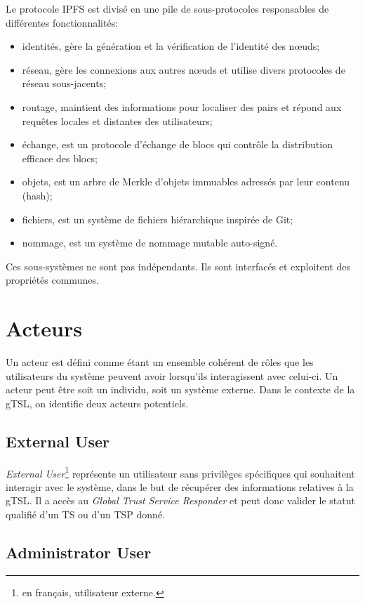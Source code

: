 \documentclass{tnreport}
\begin{document}
Le protocole IPFS est divisé en une pile de sous-protocoles responsables de différentes fonctionnalités:
\begin{itemize}
	\item identités, gère la génération et la vérification de l'identité des nœuds;
	\item réseau, gère les connexions aux autres nœuds et utilise divers protocoles de réseau sous-jacents;
	\item routage, maintient des informations pour localiser des pairs et répond aux requêtes locales et distantes des utilisateurs;
	\item échange, est un protocole d'échange de blocs qui contrôle la distribution efficace des blocs;
	\item objets, est un arbre de Merkle d'objets immuables adressés par leur contenu (hash);
	\item fichiers, est un système de fichiers hiérarchique inspirée de Git;
	\item nommage, est un système de nommage mutable auto-signé.
	\newline
\end{itemize}
Ces sous-systèmes ne sont pas indépendants. Ils sont interfacés et exploitent des propriétés communes.

\section{Acteurs}

Un acteur est défini comme étant un ensemble cohérent de rôles que les utilisateurs du système peuvent avoir lorsqu'ils interagissent avec celui-ci. Un acteur peut être soit un individu, soit un système externe. Dans le contexte de la gTSL, on identifie deux acteurs potentiels.

\subsection{External User}

\textit{External User}\footnote{en français, utilisateur externe.} représente un utilisateur sans privilèges spécifiques qui souhaitent interagir avec le système, dans le but de récupérer des informations relatives à la gTSL. Il a accès au \textit{Global Trust Service Responder} et peut donc valider le statut qualifié d'un TS ou d'un TSP donné.

\subsection{Administrator User}
\end{document}

